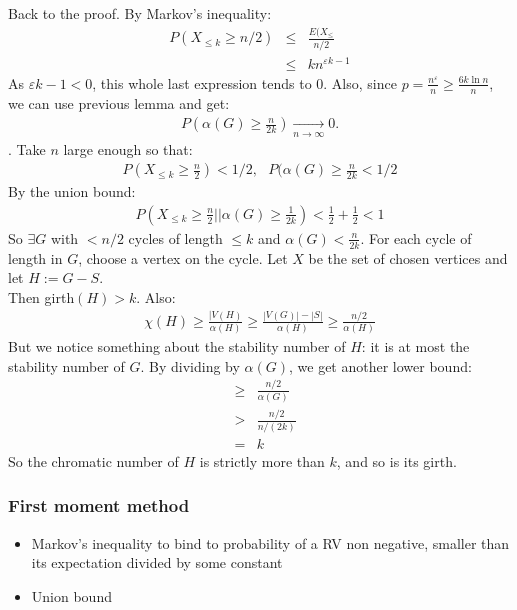 		
Back to the proof. By Markov's inequality:
\begin{eqnarray}
	P(X_{\leq k} \geq n/2) &\leq& \frac{E(X_{\leq}}{n/2} \\
	&\leq& k n^{\varepsilon k-1}
\end{eqnarray}
As $\varepsilon k-1 <0$, this whole last expression tends to 0. Also, since $p = \frac{n^\varepsilon}{n} \geq \frac{6k \ln n}{n}$, we can use previous lemma and get:
\begin{eqnarray}
	P(\alpha(G) \geq \frac{n}{2k}) \underset{n \rightarrow \infty}{\rightarrow} 0.
\end{eqnarray}.
Take $n$ large enough so that:
\begin{eqnarray}
	P(X_{\leq k} \geq \frac{n}{2}) < 1/2, ~~~
	P(\alpha(G) \geq \frac{n}{2k} < 1/2
\end{eqnarray}
By the union bound:
\begin{eqnarray}
	P(X_{\leq k} \geq \frac{n}{2} || \alpha(G) \geq \frac{1}{2k}) < \frac{1}{2} + \frac{1}{2} < 1
\end{eqnarray}
So $\exists G$ with $<n/2$ cycles of length $\leq k$ and $\alpha(G) < \frac{n}{2k}$. For each cycle of length in $G$, choose a vertex on the cycle. Let $X$ be the set of chosen vertices and let $H := G - S$.\\

Then girth$(H) > k$. Also:
\begin{eqnarray}
	\chi(H) \geq \frac{|V(H)}{\alpha(H)} \geq \frac{|V(G)| - |S|}{\alpha(H)} \geq \frac{n/2}{\alpha(H)}
\end{eqnarray} 
But we notice something about the stability number of $H$: it is at most the stability number of $G$. By dividing by $\alpha(G)$, we get another lower bound:
\begin{eqnarray}
	&\geq& \frac{n/2}{\alpha(G)}\\
	&>& \frac{n/2}{n/(2k)} \\
	&=& k
\end{eqnarray}
So the chromatic number of $H$ is strictly more than $k$, and so is its girth.

\subsubsection{First moment method} 
\begin{itemize}
	\item Markov's inequality to bind to probability of a RV non negative, smaller than its expectation divided by some constant
	\item Union bound	
\end{itemize}


